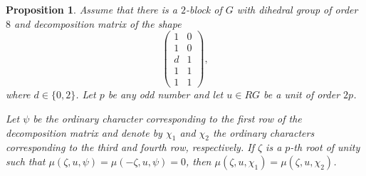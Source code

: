 \documentclass[11pt, a4paper]{amsart}
\newtheorem{proposition}[theorem]{Proposition}
\theoremstyle{definition}
\theoremstyle{definition}
\begin{document}
\begin{proposition}\label{prop:D8Defect}
Assume that there is a $2$-block of $G$ with dihedral group of order $8$ and decomposition matrix of the shape
\[\begin{pmatrix} 1 & 0 \\ 1 & 0 \\ d & 1 \\ 1 & 1 \\ 1 & 1  \end{pmatrix}, \]
where $d\in \{0,2\}$. Let $p$ be any odd number and let $u\in RG$ be a unit of order $2p$. 

Let $\psi$ be the ordinary character corresponding to the first row of the decomposition matrix and denote by $\chi_1$ and $\chi_2$ the ordinary characters corresponding to the third and fourth row, respectively. If $\zeta$ is a $p$-th root of unity such that $\mu(\zeta, u, \psi) = \mu(-\zeta, u, \psi) = 0$, then $\mu(\zeta, u, \chi_1) = \mu(\zeta, u, \chi_2)$.
\end{proposition}
\end{document}
